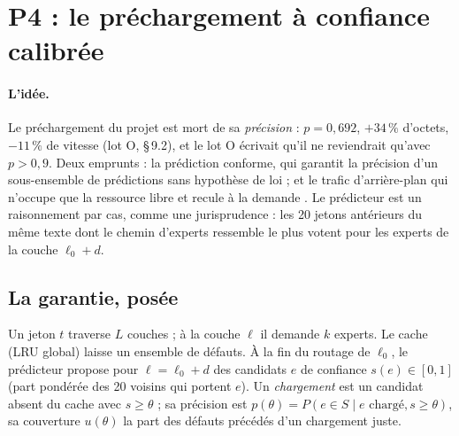 \section{P4 : le préchargement à confiance calibrée}\label{t3mim:sec:p4}

\paragraph{L'idée.} Le préchargement du projet est mort de sa \emph{précision} : $p = 0{,}692$, $+34\,\%$ d'octets, $-11\,\%$ de vitesse (lot O, §\,9.2), et le lot O écrivait qu'il ne reviendrait qu'avec $p > 0{,}9$. Deux emprunts : la prédiction conforme, qui garantit la précision d'un sous-ensemble de prédictions sans hypothèse de loi \cite{angelopoulos2021gentle,angelopoulos2021ltt} ; et le trafic d'arrière-plan qui n'occupe que la ressource libre et recule à la demande \cite{shalunov2012ledbat}. Le prédicteur est un raisonnement par cas, comme une jurisprudence : les 20 jetons antérieurs du même texte dont le chemin d'experts ressemble le plus votent pour les experts de la couche $\ell_0 + d$.

\subsection{La garantie, posée}\label{t3mim:sec:p4-garantie}

Un jeton $t$ traverse $L$ couches ; à la couche $\ell$ il demande $k$ experts. Le cache (LRU global) laisse un ensemble de défauts. À la fin du routage de $\ell_0$, le prédicteur propose pour $\ell = \ell_0 + d$ des candidats $e$ de confiance $s(e) \in [0, 1]$ (part pondérée des 20 voisins qui portent $e$). Un \emph{chargement} est un candidat absent du cache avec $s \ge \theta$ ; sa précision est $p(\theta) = P(e \in S \mid e \text{ chargé}, s \ge \theta)$, sa couverture $u(\theta)$ la part des défauts précédés d'un chargement juste.

